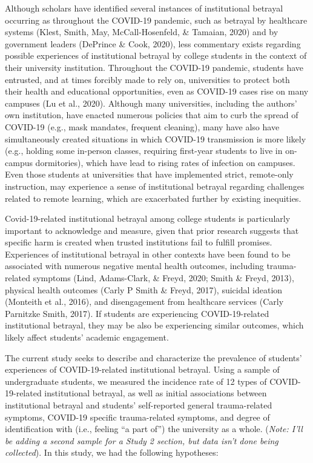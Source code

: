 \documentclass[
  english,
  man, noextraspace]{apa6}
\begin{document}
Although scholars have identified several instances of institutional betrayal occurring as throughout the COVID-19 pandemic, such as betrayal by healthcare systems (Klest, Smith, May, McCall-Hosenfeld, \& Tamaian, 2020) and by government leaders (DePrince \& Cook, 2020), less commentary exists regarding possible experiences of institutional betrayal by college students in the context of their university institution. Throughout the COVID-19 pandemic, students have entrusted, and at times forcibly made to rely on, universities to protect both their health and educational opportunities, even as COVID-19 cases rise on many campuses (Lu et al., 2020). Although many universities, including the authors' own institution, have enacted numerous policies that aim to curb the spread of COVID-19 (e.g., mask mandates, frequent cleaning), many have also have simultaneously created situations in which COVID-19 transmission is more likely (e.g., holding some in-person classes, requiring first-year students to live in on-campus dormitories), which have lead to rising rates of infection on campuses. Even those students at universities that have implemented strict, remote-only instruction, may experience a sense of institutional betrayal regarding challenges related to remote learning, which are exacerbated further by existing inequities.

Covid-19-related institutional betrayal among college students is particularly important to acknowledge and measure, given that prior research suggests that specific harm is created when trusted institutions fail to fulfill promises. Experiences of institutional betrayal in other contexts have been found to be associated with numerous negative mental health outcomes, including trauma-related symptoms (Lind, Adams-Clark, \& Freyd, 2020; Smith \& Freyd, 2013), physical health outcomes (Carly P Smith \& Freyd, 2017), suicidal ideation (Monteith et al., 2016), and disengagement from healthcare services (Carly Parnitzke Smith, 2017). If students are experiencing COVID-19-related institutional betrayal, they may be also be experiencing similar outcomes, which likely affect students' academic engagement.

The current study seeks to describe and characterize the prevalence of students' experiences of COVID-19-related institutional betrayal. Using a sample of undergraduate students, we measured the incidence rate of 12 types of COVID-19-related institutional betrayal, as well as initial associations between institutional betrayal and students' self-reported general trauma-related symptoms, COVID-19 specific trauma-related symptoms, and degree of identification with (i.e., feeling \enquote{a part of}) the university as a whole. (\emph{Note: I'll be adding a second sample for a Study 2 section, but data isn't done being collected}). In this study, we had the following hypotheses:
\end{document}
